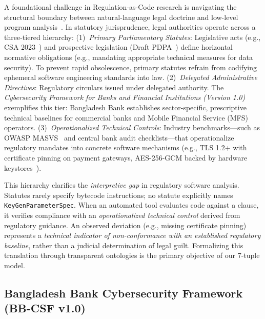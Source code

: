 A foundational challenge in Regulation-as-Code research is navigating the structural boundary between natural-language legal doctrine and low-level program analysis~\cite{breaux_requirements, catala}. In statutory jurisprudence, legal authorities operate across a three-tiered hierarchy:
(1)~\textit{Primary Parliamentary Statutes}: Legislative acts (e.g., CSA 2023~\cite{bd_csa_2026}) and prospective legislation (Draft PDPA~\cite{bd_pdpa_2026}) define horizontal normative obligations (e.g., mandating appropriate technical measures for data security). To prevent rapid obsolescence, primary statutes refrain from codifying ephemeral software engineering standards into law.
(2)~\textit{Delegated Administrative Directives}: Regulatory circulars issued under delegated authority. The \textit{Cybersecurity Framework for Banks and Financial Institutions (Version 1.0)}~\cite{bb_csf_2025} exemplifies this tier: Bangladesh Bank establishes sector-specific, prescriptive technical baselines for commercial banks and Mobile Financial Service (MFS) operators.
(3)~\textit{Operationalized Technical Controls}: Industry benchmarks—such as OWASP MASVS~\cite{owasp_masvs} and central bank audit checklists—that operationalize regulatory mandates into concrete software mechanisms (e.g., TLS 1.2+ with certificate pinning on payment gateways, AES-256-GCM backed by hardware keystores~\cite{ekberg_tee}).

This hierarchy clarifies the \textit{interpretive gap} in regulatory software analysis. Statutes rarely specify bytecode instructions; no statute explicitly names \texttt{KeyGenParameterSpec}. When an automated tool evaluates code against a clause, it verifies compliance with an \textit{operationalized technical control} derived from regulatory guidance. An observed deviation (e.g., missing certificate pinning) represents a \textit{technical indicator of non-conformance with an established regulatory baseline}, rather than a judicial determination of legal guilt. Formalizing this translation through transparent ontologies is the primary objective of our 7-tuple model.

\subsection{Bangladesh Bank Cybersecurity Framework (BB-CSF v1.0)}
\label{sec:statutory:bb}

